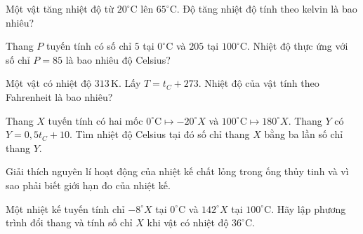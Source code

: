 \begin{ex}
Một vật tăng nhiệt độ từ $20^\circ\mathrm{C}$ lên $65^\circ\mathrm{C}$. Độ tăng nhiệt độ tính theo kelvin là bao nhiêu?
\end{ex}

\begin{ex}
Thang $P$ tuyến tính có số chỉ $5$ tại $0^\circ\mathrm{C}$ và $205$ tại $100^\circ\mathrm{C}$. Nhiệt độ thực ứng với số chỉ $P=85$ là bao nhiêu độ Celsius?
\end{ex}

\begin{ex}
Một vật có nhiệt độ $313\,\mathrm{K}$. Lấy $T=t_C+273$. Nhiệt độ của vật tính theo Fahrenheit là bao nhiêu?
\end{ex}

\begin{ex}
Thang $X$ tuyến tính có hai mốc $0^\circ\mathrm{C}\mapsto-20^\circ X$ và $100^\circ\mathrm{C}\mapsto180^\circ X$. Thang $Y$ có $Y=0{,}5t_C+10$. Tìm nhiệt độ Celsius tại đó số chỉ thang $X$ bằng ba lần số chỉ thang $Y$.
\end{ex}

\begin{bt}
Giải thích nguyên lí hoạt động của nhiệt kế chất lỏng trong ống thủy tinh và vì sao phải biết giới hạn đo của nhiệt kế.
\end{bt}

\begin{bt}
Một nhiệt kế tuyến tính chỉ $-8^\circ X$ tại $0^\circ\mathrm{C}$ và $142^\circ X$ tại $100^\circ\mathrm{C}$. Hãy lập phương trình đổi thang và tính số chỉ $X$ khi vật có nhiệt độ $36^\circ\mathrm{C}$.
\end{bt}


